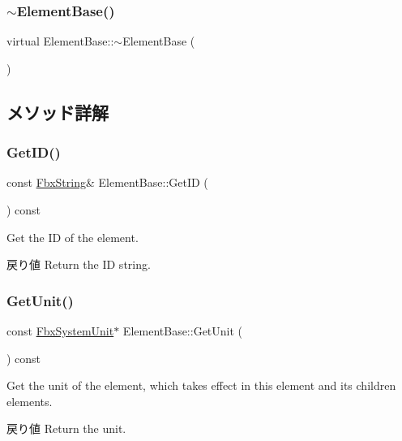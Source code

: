 \subsubsection{\texorpdfstring{$\sim$\+Element\+Base()}{~ElementBase()}}
{\footnotesize\ttfamily virtual Element\+Base\+::$\sim$\+Element\+Base (\begin{DoxyParamCaption}{ }\end{DoxyParamCaption})\hspace{0.3cm}{\ttfamily [virtual]}}



\subsection{メソッド詳解}
\mbox{\label{class_element_base_a9a8bf10158b3028d050f17d357be5ebb}} 
\subsubsection{\texorpdfstring{Get\+I\+D()}{GetID()}}
{\footnotesize\ttfamily const \hyperlink{class_fbx_string}{Fbx\+String}\& Element\+Base\+::\+Get\+ID (\begin{DoxyParamCaption}{ }\end{DoxyParamCaption}) const}

Get the ID of the element. \begin{DoxyReturn}{戻り値}
Return the ID string. 
\end{DoxyReturn}
\mbox{\label{class_element_base_a1449309f004525a5c009d1fb7d3cb60c}} 
\subsubsection{\texorpdfstring{Get\+Unit()}{GetUnit()}}
{\footnotesize\ttfamily const \hyperlink{class_fbx_system_unit}{Fbx\+System\+Unit}$\ast$ Element\+Base\+::\+Get\+Unit (\begin{DoxyParamCaption}{ }\end{DoxyParamCaption}) const}

Get the unit of the element, which takes effect in this element and its children elements. \begin{DoxyReturn}{戻り値}
Return the unit. 
\end{DoxyReturn}
\mbox{\label{class_element_base_adb072862588f793bb86e70f43df92b27}} 
